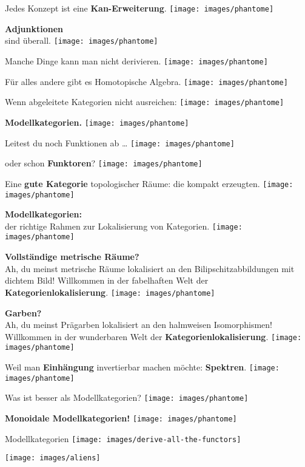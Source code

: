 \documentclass[a4paper,ngerman,landscape,30pt]{scrartcl}
\begin{document}
\newcommand{\page}[1]{
  \begin{center}
    \Huge\sffamily
    #1%
    \vfill
    \texttt{[image: images/phantome]}
  \end{center}
  \newpage
}

\page{Jedes Konzept ist eine \textbf{Kan-Erweiterung}.}

\page{\textbf{Adjunktionen} \\ sind überall.}

\page{Manche Dinge kann man nicht derivieren.}
\page{Für alles andere gibt es Homotopische Algebra.}

\page{Wenn abgeleitete Kategorien nicht ausreichen:}
\page{\textbf{Modellkategorien.}}

\page{Leitest du noch Funktionen ab \ldots}
\page{oder schon \textbf{Funktoren}?}

\page{
  Eine \textbf{gute Kategorie} topologischer Räume:
  die kompakt erzeugten.
}

\page{
  \textbf{Modellkategorien:} \\
  \huge
  der richtige Rahmen zur Lokalisierung von Kategorien.
}

\page{
  \textbf{Vollständige metrische Räume?} \\
  \large
  Ah, du meinst metrische Räume lokalisiert an den Bilipschitzabbildungen mit
  dichtem Bild!
  Willkommen in der fabelhaften Welt der \textbf{Kategorienlokalisierung}.
}

\page{
  \textbf{Garben?} \\
  \Large
  Ah, du meinst Prägarben lokalisiert an den halmweisen Isomorphismen! \\
  Willkommen in der wunderbaren Welt der \textbf{Kategorienlokalisierung}.
}

\page{
  Weil man \textbf{Einhängung} invertierbar machen möchte:
  \textbf{Spektren}.
}

\page{Was ist besser als Modellkategorien?}
\page{\textbf{Monoidale Modellkategorien!}}

\begin{center}
  \Huge\sffamily
  Modellkategorien
  \vfill
  \texttt{[image: images/derive-all-the-functors]}
\end{center}
\newpage

\begin{center}
  \texttt{[image: images/aliens]}
\end{center}
\end{document}

